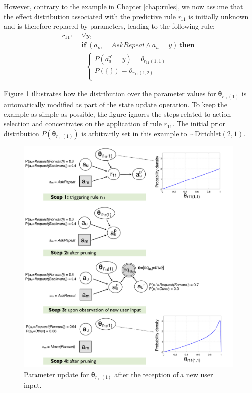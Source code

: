 However, contrary to the example in Chapter \ref{chap:rules}, we now assume that the effect distribution associated with the predictive rule $r_{11}$ is initially unknown and is therefore replaced by parameters, leading to the following rule: \vspace{-2mm}
\begin{align*}
r_{11}: \ \ & \forall y, \\ 
& \textbf{if} \ (a_m = \mathit{AskRepeat} \land a_u=y) \ \textbf{then} \\ 
& \; \;  \begin{cases} 
P(a_{u}^{p\prime} = y) = \theta_{r_{11}(1,1)} \\ 
P(\{\cdot\}) = \theta_{r_{11}(1,2)} \\ 
\end{cases}
\end{align*}

Figure \ref{fig:learningexample} illustrates how the distribution over the parameter values for $\boldsymbol\theta_{r_{11}(1)}$ is automatically modified as part of the state update operation. To keep the example as simple as possible, the figure ignores the steps related to action selection and concentrates on the application of rule $r_{11}$.  The initial prior distribution $P(\boldsymbol\theta_{r_{11}(1)})$ is arbitrarily set in this example to $\sim \mathrm{Dirichlet}(2,1)$.

\begin{figure}[h!] \vspace{4mm}
\centering
\includegraphics[scale=0.28]{imgs/learningexample.pdf} \vspace{5mm}
\caption{Parameter update for $\boldsymbol\theta_{r_{11}(1)}$ after the reception of a new user input. }
\label{fig:learningexample}
\end{figure}

